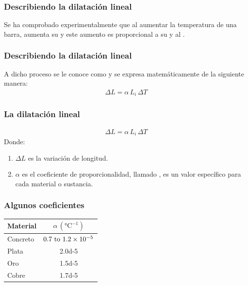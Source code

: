 \documentclass[14pt]{beamer}
\begin{document}
\begin{frame}
\frametitle{Describiendo la dilatación lineal}
Se ha comprobado experimentalmente que al aumentar la temperatura de una barra, aumenta su  \pause y este aumento es proporcional a su  \pause y al .
\end{frame}
\begin{frame}
\frametitle{Describiendo la dilatación lineal}
A dicho proceso se le conoce como  y se expresa matemáticamente de la siguiente manera:
\pause
\begin{align*}
\Delta L = \alpha \, L_{i} \, \Delta T
\end{align*}
\end{frame}
\begin{frame}
\frametitle{La dilatación lineal}
\vspace*{-1cm}
\begin{align*}
\Delta L = \alpha \, L_{i} \, \Delta T
\end{align*}
Donde:
\begin{enumerate}[<+->]
\item $\Delta L$ es la variación de longitud.
\item $\alpha$ es el coeficiente de proporcionalidad, llamado , es un valor específico para cada material o sustancia.
\seti
\end{enumerate}
\end{frame}
\begin{frame}
\frametitle{Algunos coeficientes}
\begin{table}
    \centering
    \small
    \begin{tabular}{| l | c |} \hline
        Material & $\alpha \, (\unit{\degreeCelsius}^{-1})$ \\ \hline
        Concreto & $\numrange{0.7}{1.2d-5}$ \\ \hline
        Plata & \num{2.0d-5} \\ \hline
        Oro & \num{1.5d-5} \\ \hline
        Cobre & \num{1.7d-5} \\ \hline
    \end{tabular}
\end{table}
\end{frame}
\end{document}

